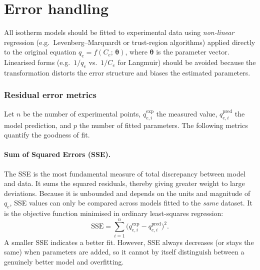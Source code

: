 ﻿	\section{Error handling}

	All isotherm models should be fitted to experimental data using
	\emph{non-linear} regression (e.g.\ Levenberg--Marquardt or
	trust-region algorithms) applied directly to the original equation
	$q_e = f(C_e;\,\boldsymbol{\theta})$, where
	$\boldsymbol{\theta}$ is the parameter vector.
	Linearised forms (e.g.\ $1/q_e$ vs.\ $1/C_e$ for Langmuir) should
	be avoided because the transformation distorts the error structure
	and biases the estimated parameters.

	\subsubsection{Residual error metrics}

	Let $n$ be the number of experimental points,
	$q_{e,i}^{\exp}$ the measured value,
	$q_{e,i}^{\mathrm{pred}}$ the model prediction, and $p$ the
	number of fitted parameters. The following metrics quantify the
	goodness of fit.

	\paragraph{Sum of Squared Errors (SSE).}
	The SSE is the most fundamental measure of total discrepancy
	between model and data. It sums the squared residuals, thereby
	giving greater weight to large deviations. Because it is
	unbounded and depends on the units and magnitude of $q_e$, SSE
	values can only be compared across models fitted to the
	\emph{same} dataset. It is the objective function minimised in
	ordinary least-squares regression:
	\begin{equation}
		\mathrm{SSE}
		= \sum_{i=1}^{n}
		\bigl(q_{e,i}^{\exp} - q_{e,i}^{\mathrm{pred}}\bigr)^{2}.
		\label{eq:SSE}
	\end{equation}
	A smaller SSE indicates a better fit. However, SSE always
	decreases (or stays the same) when parameters are added, so it
	cannot by itself distinguish between a genuinely better model and
	overfitting.

